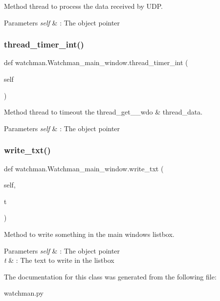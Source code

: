 Method thread to process the data received by U\+DP. 


\begin{DoxyParams}{Parameters}
{\em self} & \+: The object pointer \\
\hline
\end{DoxyParams}
\mbox{\label{classwatchman_1_1_watchman__main__window_a084e9e77a70c9f8e6e36fec24a8f590d}} 
\subsubsection{thread\_timer\_int()}
{\footnotesize\ttfamily def watchman.\+Watchman\+\_\+main\+\_\+window.\+thread\+\_\+timer\+\_\+int (\begin{DoxyParamCaption}\item[{}]{self }\end{DoxyParamCaption})}



Method thread to timeout the thread\+\_\+get\+\_\+\_\+wdo \& thread\+\_\+data. 


\begin{DoxyParams}{Parameters}
{\em self} & \+: The object pointer \\
\hline
\end{DoxyParams}
\mbox{\label{classwatchman_1_1_watchman__main__window_a9d3d9649b92b0e4098ba66205b4baf83}} 
\subsubsection{write\_txt()}
{\footnotesize\ttfamily def watchman.\+Watchman\+\_\+main\+\_\+window.\+write\+\_\+txt (\begin{DoxyParamCaption}\item[{}]{self,  }\item[{}]{t }\end{DoxyParamCaption})}



Method to write something in the main window\textquotesingle{}s listbox. 


\begin{DoxyParams}{Parameters}
{\em self} & \+: The object pointer \\
\hline
{\em t} & \+: The text to write in the listbox \\
\hline
\end{DoxyParams}


The documentation for this class was generated from the following file\+:\begin{DoxyCompactItemize}
\item 
watchman.\+py\end{DoxyCompactItemize}
